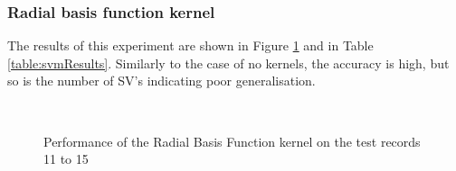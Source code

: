 \subsubsection{Radial basis function kernel}
The results of this experiment are shown in Figure \ref{fig:svmExperimentRbf} and in Table \ref{table:svmResults}. Similarly to the case of no kernels, the accuracy is high, but so is the number of SV's indicating poor generalisation.
\begin{figure}[htb]
	\centering
	 \\
	\caption{Performance of the Radial Basis Function kernel on the test records 11 to 15}
	\label{fig:svmExperimentRbf}
\end{figure}

